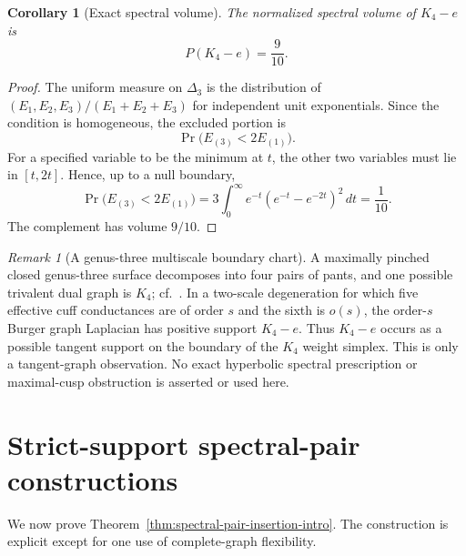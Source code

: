 \documentclass[11pt,reqno]{amsart}
\newtheorem{corollary}[theorem]{Corollary}
\theoremstyle{definition}
\theoremstyle{remark}
\newtheorem{remark}[theorem]{Remark}
\begin{document}
\begin{corollary}[Exact spectral volume]\label{cor:k4-volume}
The normalized spectral volume of $K_4-e$ is
\[
  P(K_4-e)=\frac9{10}.
\]
\end{corollary}

\begin{proof}
The uniform measure on $\Delta_3$ is the distribution of
$(E_1,E_2,E_3)/(E_1+E_2+E_3)$ for independent unit exponentials.  Since the
condition is homogeneous, the excluded portion is
\[
  \Pr\bigl(E_{(3)}<2E_{(1)}\bigr).
\]
For a specified variable to be the minimum at $t$, the other two variables
must lie in $[t,2t]$.  Hence, up to a null boundary,
\[
  \Pr\bigl(E_{(3)}<2E_{(1)}\bigr)
  =3\int_0^\infty e^{-t}(e^{-t}-e^{-2t})^2\,dt
  =\frac1{10}.
\]
The complement has volume $9/10$.
\end{proof}

\begin{remark}[A genus-three multiscale boundary chart]
\label{rem:k4-multiscale}
A maximally pinched closed genus-three surface decomposes into four pairs of
pants, and one possible trivalent dual graph is $K_4$; cf.~\cite{EJT2026}.
In a two-scale degeneration for which five effective cuff conductances are
of order $s$ and the sixth is $o(s)$, the order-$s$ Burger graph Laplacian
has positive support $K_4-e$.  Thus $K_4-e$ occurs as a possible tangent
support on the boundary of the $K_4$ weight simplex.  This is only a
tangent-graph observation.  No exact hyperbolic spectral prescription or
maximal-cusp obstruction is asserted or used here.
\end{remark}

\section{Strict-support spectral-pair constructions}
\label{sec:strict-constructions}

We now prove Theorem~\ref{thm:spectral-pair-insertion-intro}.  The
construction is explicit except for one use of complete-graph flexibility.
\end{document}

